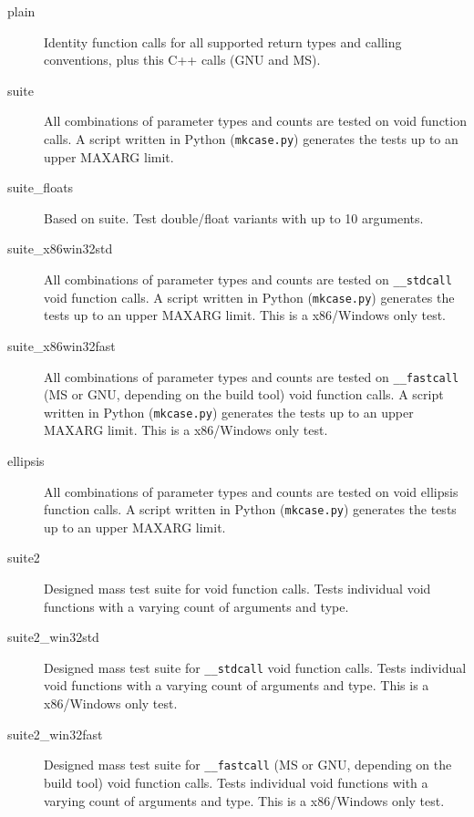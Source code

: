\begin{description}

\item [plain] 
Identity function calls for all supported return types and calling conventions,
plus this C++ calls (GNU and MS).

\item [suite] 
All combinations of parameter types and counts are tested on void function
calls. A script written in Python ({\tt mkcase.py}) generates the tests up to
an upper MAXARG limit.

\item [suite\_floats]
Based on suite. Test double/float variants with up to 10 arguments.

\item [suite\_x86win32std] 
All combinations of parameter types and counts are tested on {\tt \_\_stdcall}
void function calls. A script written in Python ({\tt mkcase.py}) generates
the tests up to an upper MAXARG limit. This is a x86/Windows only test.

\item [suite\_x86win32fast] 
All combinations of parameter types and counts are tested on {\tt \_\_fastcall}
(MS or GNU, depending on the build tool) void function calls.
A script written in Python ({\tt mkcase.py}) generates the tests up to
an upper MAXARG limit. This is a x86/Windows only test.

\item [ellipsis]

All combinations of parameter types and counts are tested on void ellipsis 
function calls. A script written in Python ({\tt mkcase.py}) generates the 
tests up to an upper MAXARG limit.

\item [suite2]

Designed mass test suite for void function calls.
Tests individual void functions with a varying count of arguments and type.

\item [suite2\_win32std]

Designed mass test suite for {\tt \_\_stdcall} void function calls.
Tests individual void functions with a varying count of arguments and type.
This is a x86/Windows only test.

\item [suite2\_win32fast]

Designed mass test suite for {\tt \_\_fastcall} (MS or GNU, depending on the build tool) void function calls.
Tests individual void functions with a varying count of arguments and type.
This is a x86/Windows only test.


\end{description}
